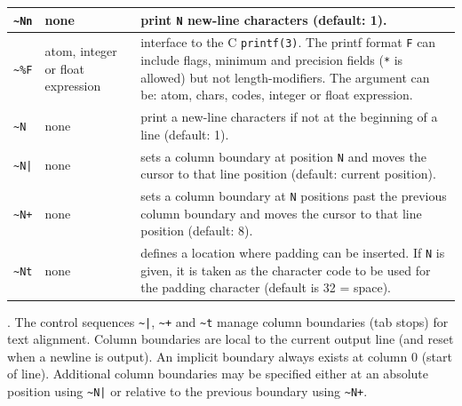 \begin{tabular}{|C{1.4cm}|C{2.8cm}|p{10.45cm}|}
\texttt{\~{}Nn} & none & print \texttt{N} new-line characters (default: 1). \\

\hline

\texttt{\~{}\%F} & atom, integer or float expression & interface to the C \texttt{printf(3)}.
\newline
                                                       The printf format \texttt{F}
                                                       can include flags,
                                                       minimum and precision fields
                                                       (\texttt{*} is allowed) but not
                                                       length-modifiers.
\newline
                                                       The argument can be:
                                                       atom, chars, codes, integer or
                                                       float expression. \\

\hline

\texttt{\~{}N} & none & print a new-line characters if not at the beginning
                        of a line (default: 1). \\

\hline

\texttt{\~{}N|} & none & sets a column boundary at position \texttt{N} and moves
                         the cursor to that line position (default: current position). \\

\hline
  
\texttt{\~{}N+} & none & sets a column boundary at \texttt{N} positions past the
                         previous column boundary and moves the cursor to that line
                         position (default: 8). \\

\hline

\texttt{\~{}Nt} & none & defines a location where padding can be
                         inserted. If \texttt{N} is given, it is taken as the
                         character code to be used for the padding character
                         (default is 32 = space). \\

\hline
\end{tabular}

. The control sequences \texttt{\~{}|},
\texttt{\~{}+} and \texttt{\~{}t} manage column boundaries (tab stops) for text
alignment. Column boundaries are local to the current output line (and reset
when a newline is output). An implicit boundary always exists at column 0 (start
of line). Additional column boundaries may be specified either at an absolute
position using \texttt{\~{}N|} or relative to the previous boundary using
\texttt{\~{}N+}.

